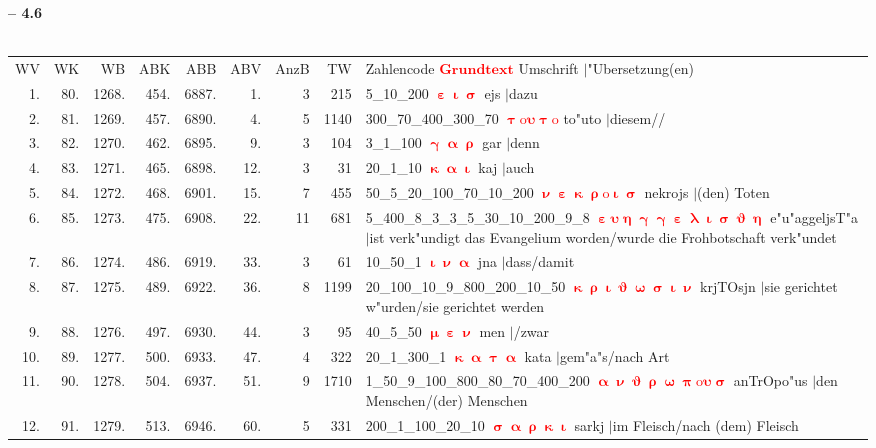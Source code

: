 \documentclass[a4paper,10pt,landscape]{article}
\begin{document}
\newpage 
{\bf -- 4.6}\\
\medskip \\
\begin{tabular}{rrrrrrrrp{120mm}}
WV&WK&WB&ABK&ABB&ABV&AnzB&TW&Zahlencode \textcolor{red}{$\boldsymbol{Grundtext}$} Umschrift $|$"Ubersetzung(en)\\
1.&80.&1268.&454.&6887.&1.&3&215&5\_10\_200 \textcolor{red}{$\boldsymbol{\upepsilon\upiota\upsigma}$} ejs $|$dazu\\
2.&81.&1269.&457.&6890.&4.&5&1140&300\_70\_400\_300\_70 \textcolor{red}{$\boldsymbol{\uptau\mathrm{o}\upsilon\uptau\mathrm{o}}$} to"uto $|$diesem//\\
3.&82.&1270.&462.&6895.&9.&3&104&3\_1\_100 \textcolor{red}{$\boldsymbol{\upgamma\upalpha\uprho}$} gar $|$denn\\
4.&83.&1271.&465.&6898.&12.&3&31&20\_1\_10 \textcolor{red}{$\boldsymbol{\upkappa\upalpha\upiota}$} kaj $|$auch\\
5.&84.&1272.&468.&6901.&15.&7&455&50\_5\_20\_100\_70\_10\_200 \textcolor{red}{$\boldsymbol{\upnu\upepsilon\upkappa\uprho\mathrm{o}\upiota\upsigma}$} nekrojs $|$(den) Toten\\
6.&85.&1273.&475.&6908.&22.&11&681&5\_400\_8\_3\_3\_5\_30\_10\_200\_9\_8 \textcolor{red}{$\boldsymbol{\upepsilon\upsilon\upeta\upgamma\upgamma\upepsilon\uplambda\upiota\upsigma\upvartheta\upeta}$} e"u"aggeljsT"a $|$ist verk"undigt das Evangelium worden/wurde die Frohbotschaft verk"undet\\
7.&86.&1274.&486.&6919.&33.&3&61&10\_50\_1 \textcolor{red}{$\boldsymbol{\upiota\upnu\upalpha}$} jna $|$dass/damit\\
8.&87.&1275.&489.&6922.&36.&8&1199&20\_100\_10\_9\_800\_200\_10\_50 \textcolor{red}{$\boldsymbol{\upkappa\uprho\upiota\upvartheta\upomega\upsigma\upiota\upnu}$} krjTOsjn $|$sie gerichtet w"urden/sie gerichtet werden\\
9.&88.&1276.&497.&6930.&44.&3&95&40\_5\_50 \textcolor{red}{$\boldsymbol{\upmu\upepsilon\upnu}$} men $|$/zwar\\
10.&89.&1277.&500.&6933.&47.&4&322&20\_1\_300\_1 \textcolor{red}{$\boldsymbol{\upkappa\upalpha\uptau\upalpha}$} kata $|$gem"a"s/nach Art\\
11.&90.&1278.&504.&6937.&51.&9&1710&1\_50\_9\_100\_800\_80\_70\_400\_200 \textcolor{red}{$\boldsymbol{\upalpha\upnu\upvartheta\uprho\upomega\uppi\mathrm{o}\upsilon\upsigma}$} anTrOpo"us $|$den Menschen/(der) Menschen\\
12.&91.&1279.&513.&6946.&60.&5&331&200\_1\_100\_20\_10 \textcolor{red}{$\boldsymbol{\upsigma\upalpha\uprho\upkappa\upiota}$} sarkj $|$im Fleisch/nach (dem) Fleisch\\

\end{tabular}
\end{document}
